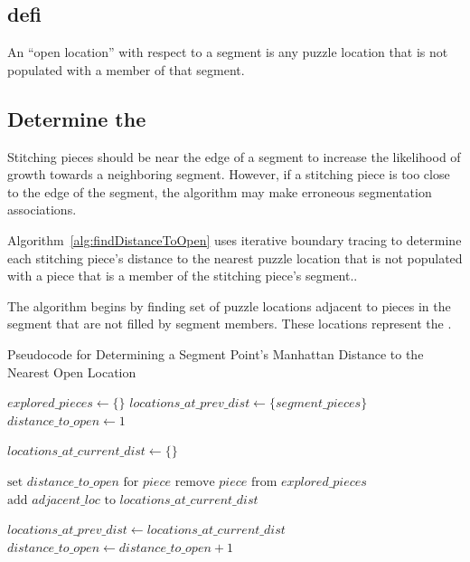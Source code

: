 \subsection{defi}



An ``open location'' with respect to a segment is any puzzle location that is not populated with a member of that segment.  

\subsection{Determine the }

Stitching pieces should be near the edge of a segment to increase the likelihood of growth towards a neighboring segment.  However,  if a stitching piece is too close to the edge of the segment, the algorithm may make erroneous segmentation associations.   

Algorithm~\ref{alg:findDistanceToOpen} uses iterative boundary tracing to determine each stitching piece's distance to the nearest puzzle location that is not populated with a piece that is a member of the stitching piece's segment..

The algorithm begins by finding set of puzzle locations adjacent to pieces in the segment that are not filled by segment members.  These locations represent the .

\begin{algorithm}[tb]
\caption{Pseudocode for Determining a Segment Point's Manhattan Distance to the Nearest Open Location}\label{alg:findDistanceToOpen}
\begin{algorithmic}[1]
    \State $\textit{explored\_pieces} \gets \{ \}$
    \State $\textit{locations\_at\_prev\_dist} \gets \{ \textit{segment\_pieces} \}$
    \State $\textit{distance\_to\_open} \gets 1$
\item[]
        \State $\textit{locations\_at\_current\_dist} \gets \{ \}$
\item[]
        		
        			\State $\text{set } \textit{distance\_to\_open} \text{ for } \textit{piece}$
        			\State $\text{remove } \textit{piece} \text{ from } \textit{explored\_pieces}$
        			\State $\text{add } \textit{adjacent\_loc} \text{ to } \textit{locations\_at\_current\_dist}$
        		\EndIf
        	\EndFor
        \EndFor
\item[]
    \State $\textit{locations\_at\_prev\_dist} \gets locations\_at\_current\_dist$
    \State $\textit{distance\_to\_open} \gets \textit{distance\_to\_open} + 1$
    \EndWhile
\EndProcedure
\end{algorithmic}
\end{algorithm}

